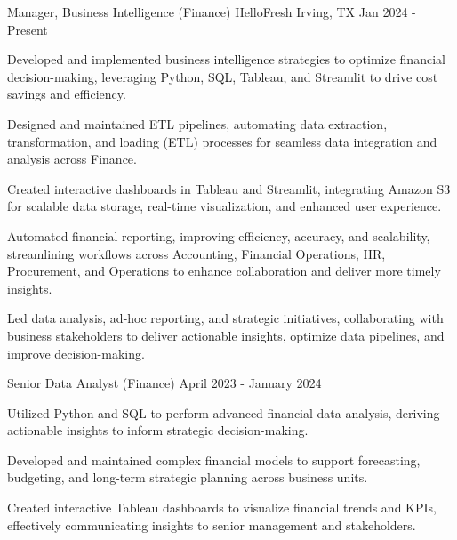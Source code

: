 

\begin{cventries}

\cventry
  {Manager, Business Intelligence (Finance)} %
  {HelloFresh} %
  {Irving, TX} %
  {Jan 2024 - Present} %
  {
    \begin{cvitems} %
      \item {Developed and implemented business intelligence strategies to optimize financial decision-making, leveraging Python, SQL, Tableau, and Streamlit to drive cost savings and efficiency.}
      \item {Designed and maintained ETL pipelines, automating data extraction, transformation, and loading (ETL) processes for seamless data integration and analysis across Finance.}
      \item {Created interactive dashboards in Tableau and Streamlit, integrating Amazon S3 for scalable data storage, real-time visualization, and enhanced user experience.}
      \item {Automated financial reporting, improving efficiency, accuracy, and scalability, streamlining workflows across Accounting, Financial Operations, HR, Procurement, and Operations to enhance collaboration and deliver more timely insights.}
      \item {Led data analysis, ad-hoc reporting, and strategic initiatives, collaborating with business stakeholders to deliver actionable insights, optimize data pipelines, and improve decision-making.}
    \end{cvitems}
  }

\cventry
  {Senior Data Analyst (Finance)} %
  {} %
  {} %
  {April 2023 - January 2024} %
  {
    \begin{cvitems} %
      \item {Utilized Python and SQL to perform advanced financial data analysis, deriving actionable insights to inform strategic decision-making.}
      \item {Developed and maintained complex financial models to support forecasting, budgeting, and long-term strategic planning across business units.}
      \item {Created interactive Tableau dashboards to visualize financial trends and KPIs, effectively communicating insights to senior management and stakeholders.}
    \end{cvitems}
  }


\end{cventries}
